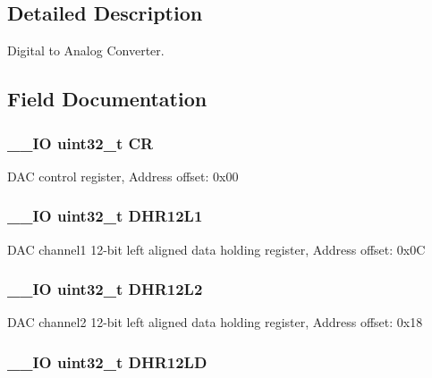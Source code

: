 \subsection{Detailed Description}
Digital to Analog Converter. 

\subsection{Field Documentation}
\hypertarget{struct_d_a_c___type_def_ab40c89c59391aaa9d9a8ec011dd0907a}{
\subsubsection[{C\-R}]{\setlength{\rightskip}{0pt plus 5cm}\-\_\-\-\_\-\-I\-O uint32\-\_\-t C\-R}}\label{struct_d_a_c___type_def_ab40c89c59391aaa9d9a8ec011dd0907a}
D\-A\-C control register, Address offset\-: 0x00 \hypertarget{struct_d_a_c___type_def_ae9028b8bcb5118b7073165fb50fcd559}{
\subsubsection[{D\-H\-R12\-L1}]{\setlength{\rightskip}{0pt plus 5cm}\-\_\-\-\_\-\-I\-O uint32\-\_\-t D\-H\-R12\-L1}}\label{struct_d_a_c___type_def_ae9028b8bcb5118b7073165fb50fcd559}
D\-A\-C channel1 12-\/bit left aligned data holding register, Address offset\-: 0x0\-C \hypertarget{struct_d_a_c___type_def_a2e45f9c9d67e384187b25334ba0a3e3d}{
\subsubsection[{D\-H\-R12\-L2}]{\setlength{\rightskip}{0pt plus 5cm}\-\_\-\-\_\-\-I\-O uint32\-\_\-t D\-H\-R12\-L2}}\label{struct_d_a_c___type_def_a2e45f9c9d67e384187b25334ba0a3e3d}
D\-A\-C channel2 12-\/bit left aligned data holding register, Address offset\-: 0x18 \hypertarget{struct_d_a_c___type_def_acc269320aff0a6482730224a4b641a59}{
\subsubsection[{D\-H\-R12\-L\-D}]{\setlength{\rightskip}{0pt plus 5cm}\-\_\-\-\_\-\-I\-O uint32\-\_\-t D\-H\-R12\-L\-D}}\label{struct_d_a_c___type_def_acc269320aff0a6482730224a4b641a59}
